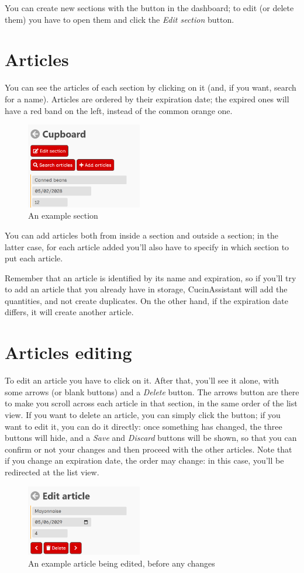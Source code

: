 \documentclass[12pt, a4paper]{report}
\begin{document}
    You can create new sections with the button in the dashboard; to edit (or delete them) you have to open them and click the 
    \emph{Edit section} button.

    \section{Articles}

    You can see the articles of each section by clicking on it (and, if you want, search for a name).
    Articles are ordered by their expiration date; the expired ones will have a red band on the left, instead of the common orange one.

    \begin{figure}[H]
        \centering
        \includegraphics[width=0.45\textwidth]{assets/en/articles.png}
        \caption{An example section}
    \end{figure}

    You can add articles both from inside a section and outside a section; in the latter case, for each article added you'll also have
    to specify in which section to put each article.

    Remember that an article is identified by its name and expiration, so if you'll try to add an article that you already have in storage,
    CucinAssistant will add the quantities, and not create duplicates. On the other hand, if the expiration date differs, it will create another
    article.

    \section{Articles editing}

    To edit an article you have to click on it. After that, you'll see it alone, with some arrows (or blank buttons) and a \emph{Delete} button.
    The arrows button are there to make you scroll across each article in that section, in the same order of the list view.
    If you want to delete an article, you can simply click the button; if you want to edit it, you can do it directly: once something has changed,
    the three buttons will hide, and a \emph{Save} and \emph{Discard} buttons will be shown, so that you can confirm or not your changes and then
    proceed with the other articles.
    Note that if you change an expiration date, the order may change: in this case, you'll be redirected at the list view.

    \begin{figure}[H]
        \centering
        \includegraphics[width=0.45\textwidth]{assets/en/article.png}
        \caption{An example article being edited, before any changes}
    \end{figure}
\end{document}
